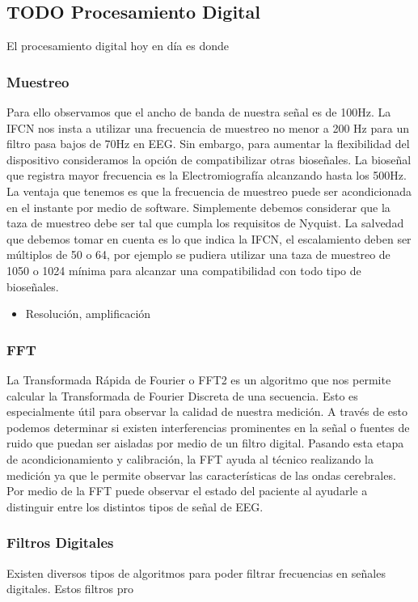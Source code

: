 \subsection{{\bfseries\sffamily TODO} Procesamiento Digital}
\label{sec:orge30d2db}
El procesamiento digital hoy en día es donde
\subsubsection{Muestreo}
\label{sec:org54e26b7}
Para ello observamos que el ancho de banda de nuestra señal es de 100Hz. La IFCN nos insta a utilizar una frecuencia de muestreo no menor a 200 Hz para un filtro pasa bajos de 70Hz en EEG. Sin embargo, para aumentar la flexibilidad del dispositivo consideramos la opción de compatibilizar otras bioseñales. La bioseñal que registra mayor frecuencia es la Electromiografía alcanzando hasta los 500Hz. La ventaja que tenemos es que la frecuencia de muestreo puede ser acondicionada en el instante por medio de software. Simplemente debemos considerar que la taza de muestreo debe ser tal que cumpla los requisitos de Nyquist. La salvedad que debemos tomar en cuenta es lo que indica la IFCN, el escalamiento deben ser múltiplos de 50 o 64, por ejemplo se pudiera utilizar una taza de muestreo de 1050 o 1024 mínima para alcanzar una compatibilidad con todo tipo de bioseñales.
\begin{itemize}
\item Resolución, amplificación
\end{itemize}
\subsubsection{FFT}
\label{sec:org4353abe}
La Transformada Rápida de Fourier o FFT2 es un algoritmo que nos permite calcular la Transformada de Fourier Discreta de una secuencia. Esto es especialmente útil para observar la calidad de nuestra medición. A través de esto podemos determinar si existen interferencias prominentes en la señal o fuentes de ruido que puedan ser aisladas por medio de un filtro digital. Pasando esta etapa de acondicionamiento y calibración, la FFT ayuda al técnico realizando la medición ya que le permite observar las características de las ondas cerebrales. Por medio de la FFT puede observar el estado del paciente al ayudarle a distinguir entre los distintos tipos de señal de EEG.

\subsubsection{Filtros Digitales}
\label{sec:org4875b3e}
Existen diversos tipos de algoritmos para poder filtrar frecuencias en señales digitales. Estos filtros pro

